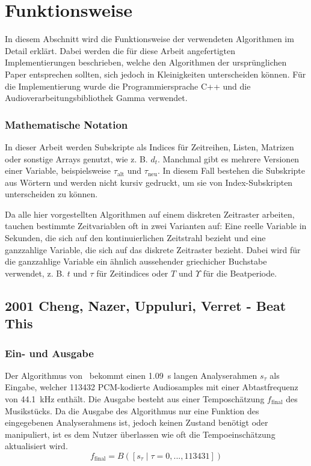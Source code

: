 \section{Funktionsweise}
{
	In diesem Abschnitt wird die Funktionsweise der verwendeten Algorithmen im Detail erklärt.
	Dabei werden die für diese Arbeit angefertigten Implementierungen beschrieben,
		welche den Algorithmen der ursprünglichen Paper entsprechen sollten,
		sich jedoch in Kleinigkeiten unterscheiden können.
	Für die Implementierung wurde die Programmiersprache C++ und die Audioverarbeitungsbibliothek Gamma verwendet.

	\subsubsection*{Mathematische Notation}
	{
		In dieser Arbeit werden Subskripte als Indices für Zeitreihen, Listen, Matrizen oder sonstige Arrays genutzt,
			wie z. B. $d_t$.
		Manchmal gibt es mehrere Versionen einer Variable,
			beispielsweise $\tau_\text{alt}$ und $\tau_\text{neu}$.
		In diesem Fall bestehen die Subskripte aus Wörtern und werden nicht kursiv gedruckt,
			um sie von Index-Subskripten unterscheiden zu können.

		Da alle hier vorgestellten Algorithmen auf einem diskreten Zeitraster arbeiten,
			tauchen bestimmte Zeitvariablen oft in zwei Varianten auf:
		Eine reelle Variable in Sekunden,
			die sich auf den kontinuierlichen Zeitstrahl bezieht
			und eine ganzzahlige Variable,
			die sich auf das diskrete Zeitraster bezieht.
		Dabei wird für die ganzzahlige Variable ein ähnlich aussehender griechicher Buchstabe verwendet,
			z. B. $t$ und $\tau$ für Zeitindices
			oder $T$ und $\Upsilon$ für die Beatperiode.
	}

	\subsection{2001 Cheng, Nazer, Uppuluri, Verret - Beat This}
	{
		\subsubsection*{Ein- und Ausgabe}
		{
			Der Algorithmus von~\cite{2001_BeatThis} bekommt einen \SI{1.09}{\second} langen Analyserahmen $s_\tau$ als Eingabe,
				welcher \num{113432} \acs{PCM}-kodierte Audiosamples mit einer Abtastfrequenz von \SI{44.1}{\kilo\hertz} enthält.
			Die Ausgabe besteht aus einer Temposchätzung $f_\text{final}$ des Musikstücks.
			Da die Ausgabe des Algorithmus nur eine Funktion des eingegebenen Analyserahmens ist,
				jedoch keinen Zustand benötigt oder manipuliert,
				ist es dem Nutzer überlassen wie oft die Tempoeinschätzung aktualisiert wird.
			\begin{equation}
				f_\text{final} = B([s_\tau \mid \tau = 0, ..., 113431])
			\end{equation}
		}

}}
